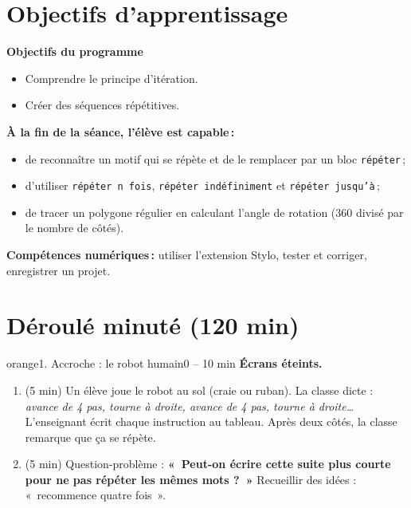 \documentclass[11pt,a4paper]{article}
\begin{document}
\section{Objectifs d'apprentissage}
\begin{tcolorbox}[colback=gray!8,colframe=gray!60!black,arc=1mm,boxrule=0.5pt]
\textbf{Objectifs du programme}
\begin{itemize}
 \item Comprendre le principe d'itération.
 \item Créer des séquences répétitives.
\end{itemize}
\textbf{À la fin de la séance, l'élève est capable\,:}
\begin{itemize}
 \item de reconnaître un motif qui se répète et de le remplacer par un bloc \texttt{répéter}\,;
 \item d'utiliser \texttt{répéter n fois}, \texttt{répéter indéfiniment} et \texttt{répéter jusqu'à}\,;
 \item de tracer un polygone régulier en calculant l'angle de rotation (360 divisé par le nombre de côtés).
\end{itemize}
\textbf{Compétences numériques\,:} utiliser l'extension Stylo, tester et corriger, enregistrer un projet.
\end{tcolorbox}

\section{Déroulé minuté (120 min)}

\begin{etape}{orange}{1. Accroche : le robot humain}{0 -- 10 min}
\textbf{Écrans éteints.}
\begin{enumerate}
 \item (5 min) Un élève joue le robot au sol (craie ou ruban). La classe dicte : \emph{avance de 4 pas, tourne à droite, avance de 4 pas, tourne à droite\ldots} L'enseignant écrit chaque instruction au tableau. Après deux côtés, la classe remarque que ça se répète.
 \item (5 min) Question-problème : \textbf{«~Peut-on écrire cette suite plus courte pour ne pas répéter les mêmes mots ?~»} Recueillir des idées : «~recommence quatre fois~».
\end{enumerate}
\end{etape}
\end{document}
